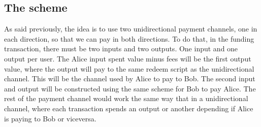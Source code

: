 \documentclass[12pt,journal,compsoc]{IEEEtran}
\begin{document}
\subsection{The scheme}
As said previously, the idea is to use two unidirectional payment channels, one in each direction, so that we can pay in both directions. To do that, in the funding transaction, there must be two inputs and two outputs. One input and one output per user. The Alice input spent value minus fees will be the first output value, where the output will pay to the same redeem script as the unidirectional channel. This will be the channel used by Alice to pay to Bob. The second input and output will be constructed using the same scheme for Bob to pay Alice. The rest of the payment channel would work the same way that in a unidirectional channel, where each transaction spends an output or another depending if Alice is paying to Bob or viceversa.
\end{document}
